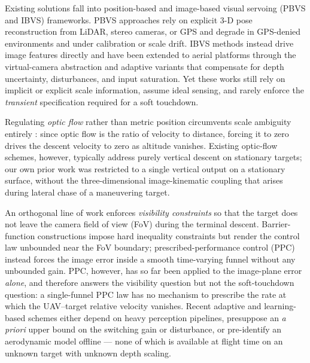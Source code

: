 \documentclass{IEEEtaes}
\begin{document}
Existing solutions fall into position-based and image-based visual servoing (PBVS and IBVS) frameworks. PBVS approaches rely on explicit 3-D pose reconstruction from LiDAR, stereo cameras, or GPS \cite{salehi2021, cho2022} and degrade in GPS-denied environments and under calibration or scale drift. IBVS methods instead drive image features directly \cite{chaumette2006} and have been extended to aerial platforms \cite{jabbari2014, lee2012, fink2017, xie2016_2, xie2020} through the virtual-camera abstraction and adaptive variants that compensate for depth uncertainty, disturbances, and input saturation. Yet these works still rely on implicit or explicit scale information, assume ideal sensing, and rarely enforce the \emph{transient} specification required for a soft touchdown.

Regulating \emph{optic flow} rather than metric position circumvents scale ambiguity entirely \cite{herisse2012, izzo2011}: since optic flow is the ratio of velocity to distance, forcing it to zero drives the descent velocity to zero as altitude vanishes. Existing optic-flow schemes, however, typically address purely vertical descent on stationary targets; our own prior work \cite{singhal2025} was restricted to a single vertical output on a stationary surface, without the three-dimensional image-kinematic coupling that arises during lateral chase of a maneuvering target.

An orthogonal line of work enforces \emph{visibility constraints} so that the target does not leave the camera field of view (FoV) during the terminal descent. Barrier-function constructions \cite{salehi2021} impose hard inequality constraints but render the control law unbounded near the FoV boundary; prescribed-performance control (PPC) \cite{lin2022} instead forces the image error inside a smooth time-varying funnel without any unbounded gain. PPC, however, has so far been applied to the image-plane error \emph{alone}, and therefore answers the visibility question but not the soft-touchdown question: a single-funnel PPC law has no mechanism to prescribe the rate at which the UAV--target relative velocity vanishes. Recent adaptive and learning-based schemes \cite{paris2020, chen2025, bouazza2025, kamath2026, zhang2026} either depend on heavy perception pipelines, presuppose an \emph{a priori} upper bound on the switching gain or disturbance, or pre-identify an aerodynamic model offline --- none of which is available at flight time on an unknown target with unknown depth scaling.
\end{document}

